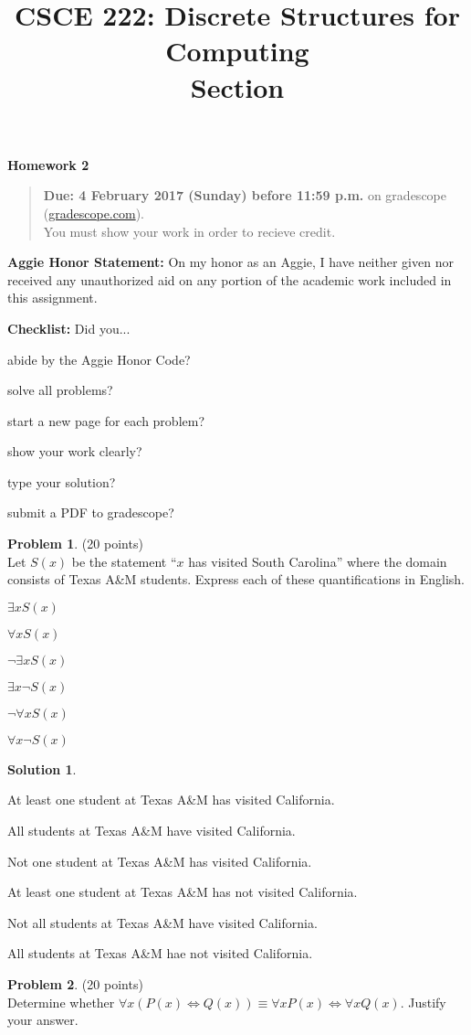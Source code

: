 \documentclass{article}
\title{CSCE 222: Discrete Structures for Computing\\Section \mysectionnumber\\\mysemester}
\author{\myname}
\date{}
\theoremstyle{definition}
\newtheorem{problem}{Problem}
\newtheorem*{solution}{Solution}
\newcommand{\honor}{\noindent \textbf{Aggie Honor Statement: }On my honor as an Aggie, I have neither
  given nor received any unauthorized aid on any portion of the academic work included in this assignment.
}
\newcommand{\checklist}{\noindent\textbf{Checklist:}
Did you...
\begin{compactenum}
\item abide by the Aggie Honor Code?
\item solve all problems?
\item start a new page for each problem?
\item show your work clearly?
\item type your solution?
\item submit a PDF to gradescope?
\end{compactenum}
}
\newcommand{\problemset}[1]{\begin{center}\textbf{Homework #1}\end{center}}
\newcommand{\duedate}[1]{\begin{quote}\textbf{Due: #1} on gradescope (\url{gradescope.com}). \\You must show your work in order to recieve credit.\end{quote}}
\newcommand{\homeworknumber}[0]{2}
\begin{document}
\maketitle
\problemset{\homeworknumber}
\duedate{4 February 2017 (Sunday) before 11:59 p.m.}
\bigskip

\honor
\bigskip

\checklist

\begin{problem} (20 points)\\
Let $S(x)$ be the statement ``$x$ has visited South Carolina'' where the domain consists of Texas A\&M students.  Express each of these quantifications in English.
\begin{compactenum}
\item $\exists x S(x)$
\item $\forall x S(x)$
\item $\neg\exists x S(x)$
\item $\exists x \neg S(x)$
\item $\neg \forall x S(x)$
\item $\forall x \neg S(x)$
\end{compactenum}
\end{problem}

\begin{solution}\ \\
\begin{compactenum}
\item At least one student at Texas A\&M has visited California.\
\item All students at Texas A\&M have visited California.\ 
\item Not one student at Texas A\&M has visited California.\
\item At least one student at Texas A\&M has not visited California.\ 
\item Not all students at Texas A\&M have visited California.\ 
\item All students at Texas A\&M hae not visited California.\ 
\end{compactenum}
\end{solution}

\newpage

\begin{problem} (20 points)\\
Determine whether $\forall x (P(x) \iff Q(x)) \equiv  \forall x P(x) \iff \forall x Q(x)$. Justify your answer.
\end{problem}
\end{document}
